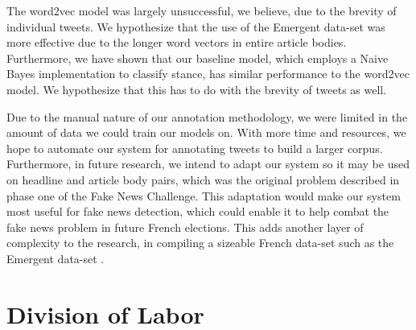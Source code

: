 \documentclass[journal]{IEEEtran}
\begin{document}
The word2vec model was largely unsuccessful, we believe, due to the brevity of individual tweets. We hypothesize that the use of the Emergent data-set \cite{ferreira_vlachos_2016} was more effective due to the longer word vectors in entire article bodies. Furthermore, we have shown that our baseline model, which employs a Naive Bayes implementation to classify stance, has similar performance to the word2vec model. We hypothesize that this has to do with the brevity of tweets as well.

Due to the manual nature of our annotation methodology, we were limited in the amount of data we could train our models on. With more time and resources, we hope to automate our system for annotating tweets to build a larger corpus. Furthermore, in future research, we intend to adapt our system so it may be used on headline and article body pairs, which was the original problem described in phase one of the Fake News Challenge. This adaptation would make our system most useful for fake news detection, which could enable it to help combat the fake news problem in future French elections. This adds another layer of complexity to the research, in compiling a sizeable French data-set such as the Emergent data-set \cite{ferreira_vlachos_2016}. 




\ifCLASSOPTIONcaptionsoff
  \newpage
\fi






\section{Division of Labor}
\end{document}
